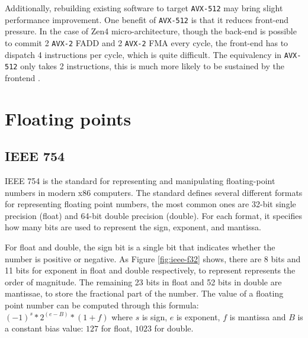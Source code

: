 \documentclass[logo,bsc,singlespacing,parskip]{infthesis}
\begin{document}
Additionally, rebuilding existing software to target \texttt{AVX-512} may bring slight
performance improvement. One benefit of \texttt{AVX-512} is that it reduces front-end
pressure. In the case of Zen4 micro-architecture, though the back-end is
possible to commit 2 \texttt{AVX-2}  FADD and 2 \texttt{AVX-2}  FMA every cycle, the front-end
has to dispatch 4 instructions per cycle, which is quite difficult. The
equivalency in \texttt{AVX-512} only takes 2 instructions, this is much more likely to be
sustained by the frontend \cite{Zen4Critique}.


\section{Floating points}
\label{sec:i23}
\subsection{IEEE 754}
\label{sec:IEEE754}
IEEE 754 is the standard for representing and manipulating floating-point
numbers in modern x86 computers. The standard defines several different formats
for representing floating point numbers, the most common ones are 32-bit single
precision (float) and 64-bit double precision (double). For each format, it
specifies how many bits are used to represent the sign, exponent, and mantissa. 

For float and double, the sign bit is a single bit that indicates whether the
number is positive or negative. As Figure \ref{fig:ieee-f32} shows, there are 8
bits and 11 bits for exponent in float and double respectively, to represent
represents the order of magnitude. The remaining 23 bits in float and 52 bits in
double are mantissae, to store the fractional part of the number. The value of a
floating point number can be computed through this formula: 
\begin{math} (-1)^s * 2^{(e - B)} * (1 + f)\end{math}
where \begin{math}s\end{math} is sign, \begin{math}e\end{math} is exponent, 
\begin{math}f\end{math} is mantissa and \begin{math}B\end{math} is a constant bias
value: \begin{math}127\end{math} for float, \begin{math}1023\end{math} for double. 
\end{document}
